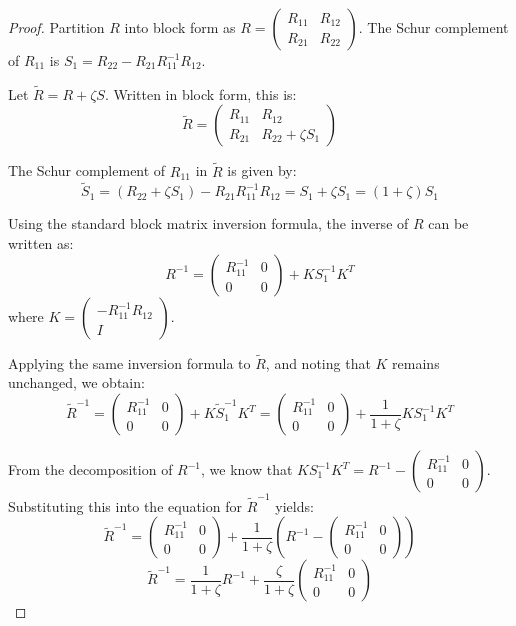 \documentclass[11pt]{article}
\begin{document}
\begin{proof}
Partition $R$ into block form as $R = \begin{pmatrix} R_{11} & R_{12} \\ R_{21} & R_{22} \end{pmatrix}$. The Schur complement of $R_{11}$ is $S_1 = R_{22} - R_{21} R_{11}^{-1} R_{12}$.

Let $\tilde{R} = R + \zeta S$. Written in block form, this is:
\[
\tilde{R} = \begin{pmatrix} R_{11} & R_{12} \\ R_{21} & R_{22} + \zeta S_1 \end{pmatrix}
\]

The Schur complement of $R_{11}$ in $\tilde{R}$ is given by:
\[
\tilde{S}_1 = (R_{22} + \zeta S_1) - R_{21} R_{11}^{-1} R_{12} = S_1 + \zeta S_1 = (1 + \zeta) S_1
\]

Using the standard block matrix inversion formula, the inverse of $R$ can be written as:
\[
R^{-1} = \begin{pmatrix} R_{11}^{-1} & 0 \\ 0 & 0 \end{pmatrix} + K S_1^{-1} K^T
\]
where $K = \begin{pmatrix} -R_{11}^{-1} R_{12} \\ I \end{pmatrix}$.

Applying the same inversion formula to $\tilde{R}$, and noting that $K$ remains unchanged, we obtain:
\[
\tilde{R}^{-1} = \begin{pmatrix} R_{11}^{-1} & 0 \\ 0 & 0 \end{pmatrix} + K \tilde{S}_1^{-1} K^T = \begin{pmatrix} R_{11}^{-1} & 0 \\ 0 & 0 \end{pmatrix} + \frac{1}{1 + \zeta} K S_1^{-1} K^T
\]

From the decomposition of $R^{-1}$, we know that $K S_1^{-1} K^T = R^{-1} - \begin{pmatrix} R_{11}^{-1} & 0 \\ 0 & 0 \end{pmatrix}$. Substituting this into the equation for $\tilde{R}^{-1}$ yields:
\[
\tilde{R}^{-1} = \begin{pmatrix} R_{11}^{-1} & 0 \\ 0 & 0 \end{pmatrix} + \frac{1}{1 + \zeta} \left( R^{-1} - \begin{pmatrix} R_{11}^{-1} & 0 \\ 0 & 0 \end{pmatrix} \right)
\]
\[
\tilde{R}^{-1} = \frac{1}{1 + \zeta} R^{-1} + \frac{\zeta}{1 + \zeta} \begin{pmatrix} R_{11}^{-1} & 0 \\ 0 & 0 \end{pmatrix}
\]


\end{proof}
\end{document}
